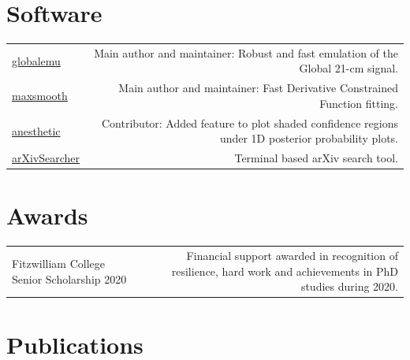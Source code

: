 \documentclass[12pt]{article}
\begin{document}
	\section*{Software}

	\begin{tabular}{L!{\vrule}R}
		\href{https://github.com/htjb/globalemu}{globalemu} & Main author and maintainer: Robust and fast emulation of the Global 21-cm signal.\\
		\href{https://github.com/htjb/maxsmooth}{maxsmooth} & Main author and maintainer: Fast Derivative Constrained Function fitting.\\
		\href{https://github.com/williamjameshandley/anesthetic}{anesthetic} & Contributor: Added feature to plot shaded confidence regions under 1D posterior probability plots.\\
		\href{https://github.com/htjb/arXivSearcher}{arXivSearcher} & Terminal based arXiv search tool.
	\end{tabular}

	\section*{Awards}
	
	\begin{tabular}{L!{\vrule}R}
		Fitzwilliam College Senior Scholarship 2020 & Financial support awarded in recognition of resilience, hard work and achievements in PhD studies during 2020.
	\end{tabular}

	\section*{Publications}
\end{document}
